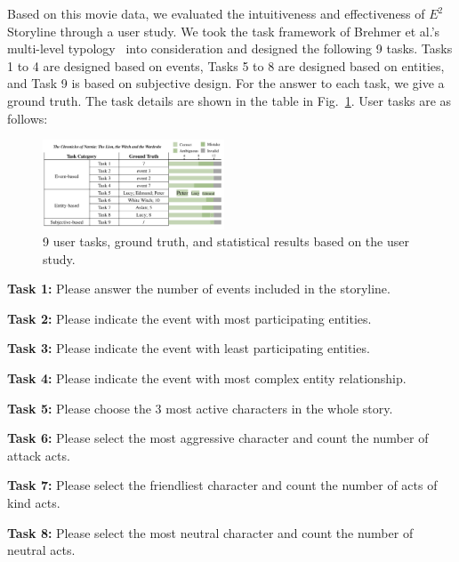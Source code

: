 \documentclass[review,journal]{vgtc}         %
\begin{document}
Based on this movie data, we evaluated the intuitiveness and effectiveness of $E^2$Storyline through a user study.
We took the task framework of Brehmer et al.'s multi-level typology~\cite{brehmer_multi_2013} into consideration and designed the following 9 tasks.
Tasks 1 to 4 are designed based on events, Tasks 5 to 8 are designed based on entities, and Task 9 is based on subjective design.
For the answer to each task, we give a ground truth. The task details are shown in the table in Fig.~\ref{fig:usertask}.
User tasks are as follows:
\begin{figure}[h]
	\centering
	\includegraphics[width=0.48\textwidth]{Fig/usertask_stas.pdf}
	\vspace{-0.5em}
	\caption{9 user tasks, ground truth, and statistical results based on the user study.}
	\vspace{-0.5em}
	\label{fig:usertask}
\end{figure}

\textbf{Task 1:} Please answer the number of events included in the storyline.

\textbf{Task 2:} Please indicate the event with most participating entities.

\textbf{Task 3:} Please indicate the event with least participating entities.

\textbf{Task 4:} Please indicate the event with most complex entity relationship.

\textbf{Task 5:} Please choose the 3 most active characters in the whole story.

\textbf{Task 6:} Please select the most aggressive character and count the number of attack acts.

\textbf{Task 7:} Please select the friendliest character and count the number of acts of kind acts.

\textbf{Task 8:} Please select the most neutral character and count the number of neutral acts.
\end{document}
